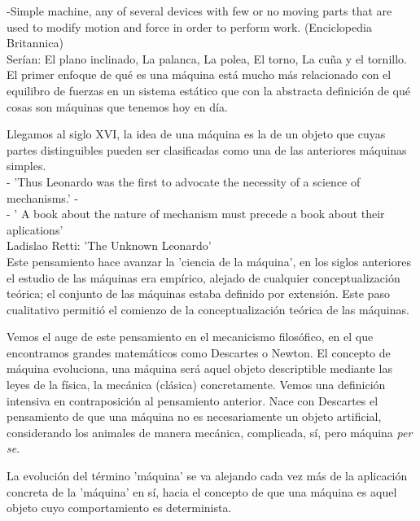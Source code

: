 -Simple machine, any of several devices with few or no moving parts that are used to modify motion and force in order to perform work. (Enciclopedia Britannica) \\


Serían: El plano inclinado, La palanca, La polea, El torno, La cuña y el tornillo. El primer enfoque de qué es una máquina está mucho más relacionado con el equilibro de fuerzas en un sistema estático que con la abstracta definición de qué cosas son máquinas que tenemos hoy en día. 

\vspace{10px}

Llegamos al siglo XVI, la idea de una máquina es la de un objeto que cuyas partes distinguibles pueden ser clasificadas como una de las anteriores máquinas simples. \\

- 'Thus Leonardo was the first to advocate the necessity of a science of mechanisms.' -  \\

- ' A book about the nature of mechanism must precede a book about their aplications' \\

Ladislao Retti: 'The Unknown Leonardo' \\

Este pensamiento hace avanzar la 'ciencia de la máquina', en los siglos anteriores el estudio de las máquinas era empírico, alejado de cualquier conceptualización teórica; el conjunto de las máquinas estaba definido por extensión. Este paso cualitativo permitió el comienzo de la conceptualización teórica de las máquinas.

\vspace{10px}

Vemos el auge de este pensamiento en el mecanicismo filosófico, en el que encontramos grandes matemáticos como Descartes o Newton. El concepto de máquina evoluciona, una máquina será aquel objeto descriptible mediante las leyes de la física, la mecánica (clásica) concretamente. Vemos una definición intensiva en contraposición al pensamiento anterior. Nace con Descartes el pensamiento de que una máquina no es necesariamente un objeto artificial, considerando los animales de manera mecánica, complicada, sí, pero máquina \textit{per se}. 


La evolución del término 'máquina' se va alejando cada vez más de la aplicación concreta de la 'máquina' en sí, hacia el concepto de que una máquina es aquel objeto cuyo comportamiento es determinista. \\

